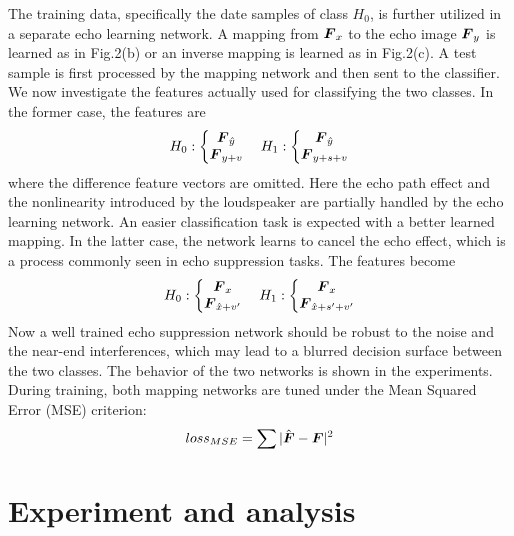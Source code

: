 \documentclass[a4paper]{article}
\begin{document}
The training data, specifically the date samples of class $H_0$, is further utilized in a separate echo learning network. A mapping from $\bm{{F}}_x$ to the echo image $\bm{{F}}_y$ is learned as in Fig.2(b) or an inverse mapping is learned as in Fig.2(c). A test sample is first processed by the mapping network and then sent to the classifier. We now investigate the features actually used for classifying the two classes. In the former case, the features are
\begin{displaymath}
H_0 : \left \{ \begin{matrix} \bm{{F}}_{\hat{y}} \\ \bm{{F}}_{y+v} \end{matrix} \right.
\quad H_1 : \left \{ \begin{matrix} \bm{{F}}_{\hat{y}} \\ \bm{{F}}_{y+s+v} \end{matrix} \right.
\end{displaymath}
where the difference feature vectors are omitted. Here the echo path effect and the nonlinearity introduced by the loudspeaker are partially handled by the echo learning network. An easier classification task is expected with a better learned mapping. In the latter case, the network learns to cancel the echo effect, which is a process commonly seen in echo suppression tasks. The features become
\begin{displaymath}
H_0 : \left \{ \begin{matrix} \bm{{F}}_{x} \\ \bm{{F}}_{\hat{x}+v'} \end{matrix} \right.
\quad H_1 : \left \{ \begin{matrix} \bm{{F}}_{x} \\ \bm{{F}}_{\hat{x}+s'+v'} \end{matrix} \right.
\end{displaymath}
Now a well trained echo suppression network should be robust to the noise and the near-end interferences, which may lead to a blurred decision surface between the two classes. The behavior of the two networks is shown in the experiments. During training, both mapping networks are tuned under the Mean Squared Error (MSE) criterion:
\begin{equation}\label{eq:mmse}
  loss_{MSE}=\sum |\hat{\bm{{F}}}-\bm{{F}}|^2
\end{equation}


\section{Experiment and analysis}
\end{document}
